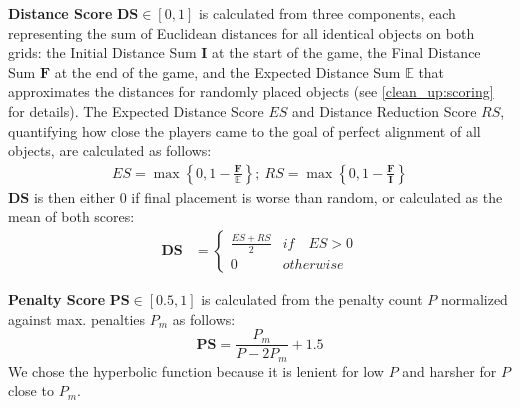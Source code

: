 \textbf{Distance Score} $\mathbf{DS} \in [0,1]$ is calculated from three components, each representing the sum of Euclidean distances for all identical objects on both grids: the Initial Distance Sum $\mathbf{I}$ at the start of the game, the Final Distance Sum $\mathbf{F}$ at the end of the game, and the Expected Distance Sum $\mathbb{E}$ that approximates the distances for randomly placed objects (see \cref{clean_up:scoring} for details). The Expected Distance Score $ES$ and Distance Reduction Score $RS$, quantifying how close the players came to the goal of perfect alignment of all objects, are calculated as follows:
\begin{align*}
ES = \max \left\{0,1 - \frac{\mathbf{F}}{\mathbb{E}} \right\}; \
RS = \max \left\{0,1 - \frac{\mathbf{F}}{\mathbf{I}} \right\}
\end{align*}
$\mathbf{DS}$ is then either $0$ if final placement is worse than random, or calculated as the mean of both scores:
\begin{align*}
\mathbf{DS} &= \begin{cases}
\frac{ES+RS}{2} & if \quad ES > 0 \\
0 & otherwise
\end{cases}
\end{align*}

\textbf{Penalty Score} $\mathbf{PS} \in [0.5,1]$ is calculated from the penalty count $P$ normalized against max. penalties $P_m$ as follows:
$$\mathbf{PS} = \frac{P_m}{P-2P_m}+1.5$$
We chose the hyperbolic function because it is lenient for low $P$ and harsher for $P$ close to $P_m$.